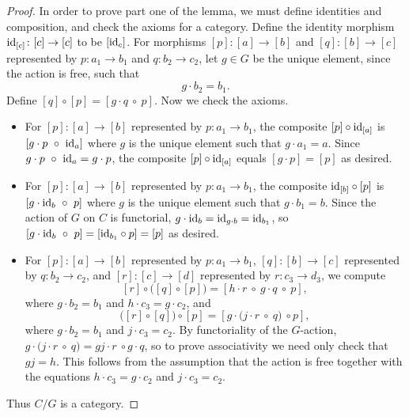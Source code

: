\begin{proof}
In order to prove part one of the lemma, we must define identities and composition, and check the axioms for a category. Define the identity morphism $\textrm{id}_{[c]} \colon [c] \to [c]$ to be $[\textrm{id}_{c}]$. For morphisms $[p] \colon [a] \to [b]$ and $[q] \colon [b] \to [c]$ represented by $p \colon a_1 \to b_1$ and $q \colon b_2 \to c_2$, let $g \in G$ be the unique element, since the action is free, such that
\[
g \cdot b_2 = b_1.
\]
Define $[q] \circ [p] = [g\cdot q \ \circ \ p]$. Now we check the axioms.
\begin{itemize}
\item For $[p] \colon [a] \to [b]$ represented by $p \colon a_1 \to b_1$, the composite $[p] \circ \textrm{id}_{[a]}$ is $[g \cdot p \ \circ \ \textrm{id}_{a}]$ where $g$ is the unique element such that $g \cdot a_1 = a$. Since $g \cdot p \ \circ \ \textrm{id}_{a} = g \cdot p$, the composite  $[p] \circ \textrm{id}_{[a]}$ equals $[g \cdot p] = [p]$ as desired.
\item For $[p] \colon [a] \to [b]$ represented by $p \colon a_1 \to b_1$, the composite $\textrm{id}_{[b]} \circ [p]$ is $[g \cdot \textrm{id}_{b} \ \circ \ p]$ where $g$ is the unique element such that $g \cdot b_1 = b$. Since the action of $G$ on $C$ is functorial, $g \cdot \textrm{id}_{b} = \textrm{id}_{g \cdot b} = \textrm{id}_{b_1}$, so $[g \cdot \id_{b} \ \circ \ p] = [\id_{b_1} \circ p] = [p]$ as desired.
\item For $[p] \colon [a] \to [b]$ represented by $p \colon a_1 \to b_1$, $[q] \colon [b] \to [c]$ represented by $q \colon b_2 \to c_2$, and $[r] \colon [c] \to [d]$ represented by $r \colon c_3 \to d_3$, we compute
\[
[r] \circ \big([q] \circ [p]\big) = [h \cdot r \ \circ \ g \cdot q \ \circ \ p],
\]
where $g \cdot b_2 = b_1$ and $h \cdot c_3 = g \cdot c_2$, and
\[
\big([r] \circ [q]\big) \circ [p] = [g \cdot \big( j \cdot r \ \circ \ q \big) \ \circ p],
\]
where $g \cdot b_2 = b_1$ and $j \cdot c_3 = c_2$. By functoriality of the $G$-action, $g \cdot \big( j \cdot r \ \circ \ q \big) = gj \cdot r \ \circ g \cdot q$, so to prove associativity we need only check that $gj = h$. This follows from the assumption that the action is free together with the equations $h \cdot c_3 = g \cdot c_2$ and $j \cdot c_3 = c_2$.
\end{itemize}
Thus $C/G$ is a category.


\end{proof}
